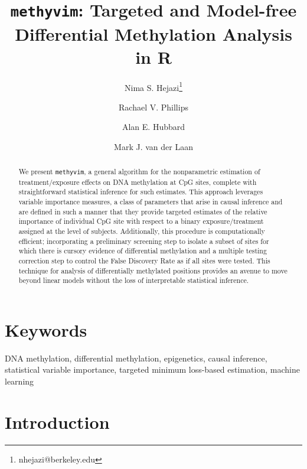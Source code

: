 \documentclass[9pt,a4paper,]{extarticle}
\theoremstyle{definition}
\theoremstyle{definition}
\theoremstyle{definition}
\theoremstyle{remark}
\begin{document}
\pagestyle{front}

\title{\texttt{methyvim}: Targeted and Model-free Differential Methylation Analysis in R}

\author[1,2]{Nima S. Hejazi\thanks{\ttfamily nhejazi@berkeley.edu}}
\author[1]{Rachael V. Phillips}
\author[1]{Alan E. Hubbard}
\author[1,3]{Mark J. van der Laan}

\maketitle
\thispagestyle{front}

\begin{abstract}
We present \texttt{methyvim}, a general algorithm for the nonparametric estimation of
treatment/exposure effects on DNA methylation at CpG sites, complete with
straightforward statistical inference for such estimates. This approach
leverages variable importance measures, a class of parameters that arise in
causal inference and are defined in such a manner that they provide targeted
estimates of the relative importance of individual CpG site with respect to
a binary exposure/treatment assigned at the level of subjects. Additionally,
this procedure is computationally efficient; incorporating a preliminary
screening step to isolate a subset of sites for which there is cursory
evidence of differential methylation and a multiple testing correction step
to control the False Discovery Rate as if all sites were tested. This
technique for analysis of differentially methylated positions provides an
avenue to move beyond linear models without the loss of interpretable
statistical inference.
\end{abstract}

\section*{Keywords}
DNA methylation, differential methylation, epigenetics, causal inference, statistical variable importance, targeted minimum loss-based estimation, machine learning


\clearpage
\pagestyle{main}

\hypertarget{introduction}{%
\section{Introduction}\label{introduction}}
\end{document}
